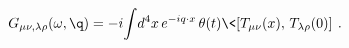 \begin{equation}
  G_{\mu\nu,\lambda\rho} (\omega, \q)
  = -i\!\int\!d^4x\,e^{-iq\cdot x}\,
  \theta(t) \< [T_{\mu\nu}(x),\, T_{\lambda\rho}(0)] \>\,.
\end{equation}

